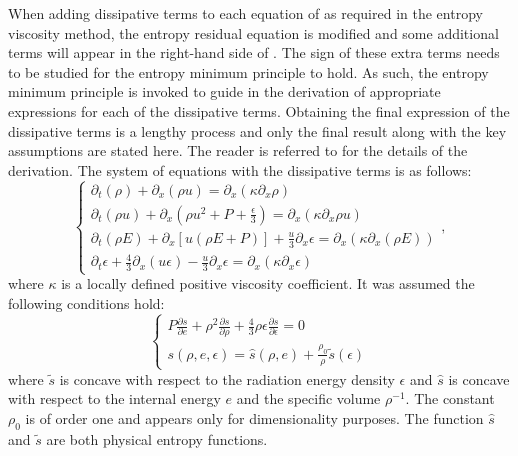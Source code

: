 When adding dissipative terms to each equation of  as required in the entropy viscosity method, the entropy residual equation is modified and some additional terms will appear in the right-hand side of . The sign of these extra terms needs to be studied for the entropy minimum principle to hold. As such, the entropy minimum principle is invoked to guide in the derivation of appropriate expressions for each of the dissipative terms. Obtaining the final expression of the dissipative terms is a lengthy process and only the final result along with the key assumptions are stated here. The reader is referred to  for the details of the derivation. The system of equations with the dissipative terms is as follows:
\begin{equation}
\label{eq:equation7}
\left\{
\begin{array}{lll}
\partial_t \left( \rho \right) + \partial_x\left( \rho u \right) = \partial_x \left( \kappa \partial_x \rho \right) \\
\partial_t \left( \rho u\right) + \partial_x \left(\rho u^2 + P + \frac{\epsilon}{3} \right) = \partial_x \left( \kappa \partial_x \rho u \right) \\
\partial_t \left( \rho E\right) + \partial_x \left[ u \left( \rho E + P \right) \right] + \frac{u}{3} \partial_x \epsilon = \partial_x \left( \kappa \partial_x(\rho E) \right)\\
\partial_t \epsilon + \frac{4}{3} \partial_x \left( u \epsilon \right) - \frac{u}{3} \partial_x \epsilon = \partial_x \left( \kappa \partial_x \epsilon \right)
\end{array}
\right. ,
\end{equation}
where $\kappa$ is a locally defined positive viscosity coefficient. It was assumed the following conditions hold:
\begin{equation}
\label{eq:equation7bis}
\left\{
\begin{array}{ll}
P \frac{\partial s}{\partial e} + \rho^2 \frac{\partial s}{\partial \rho} + \frac{4}{3} \rho \epsilon \frac{\partial s}{\partial \epsilon} = 0 \\
s( \rho, e, \epsilon) = \hat{s}(\rho, e) + \frac{\rho_0}{\rho}\tilde{s}(\epsilon) 
\end{array}
\right.
\end{equation}
where $\tilde{s}$ is concave with respect to the radiation energy density $\epsilon$ and $\hat{s}$ is concave with respect to the internal energy $e$ and the specific volume $\rho^{-1}$. The constant $\rho_0$ is of order one and appears only for dimensionality purposes. The function $\hat{s}$ and $\tilde{s}$ are both physical entropy functions.\\
